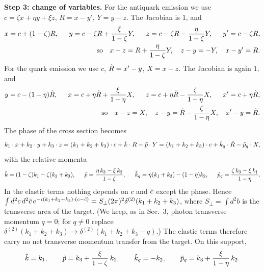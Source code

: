\documentclass[9pt]{article}
\numberwithin{equation}{section}
\begin{document}
\noindent\textbf{Step 3: change of variables.} For the antiquark emission we use $c=\zeta x+\eta y+\xi z$, $R=x-y'$, $Y=y-z$. The Jacobian is $1$, and
\begin{align}
x = c+(1-\zeta)R,\hspace{1.5em} y = c-\zeta R+\frac{\xi}{1-\zeta}Y,\hspace{1.5em} z = c-\zeta R-\frac{\eta}{1-\zeta}Y,\hspace{1.5em} y' = c-\zeta R,\notag \\ \text{so}\hspace{1em} x-z = R+\frac{\eta}{1-\zeta}Y,\hspace{1em} z-y=-Y,\hspace{1em} x-y' = R .
\end{align}
For the quark emission we use $c$, $\Tilde{R}=x'-y$, $X=x-z$. The Jacobian is again $1$, and
\begin{align}
y = c-(1-\eta)\Tilde{R},\hspace{1.5em} x = c+\eta\Tilde{R}+\frac{\xi}{1-\eta}X,\hspace{1.5em} z = c+\eta\Tilde{R}-\frac{\zeta}{1-\eta}X,\hspace{1.5em} x' = c+\eta\Tilde{R},\notag \\ \text{so}\hspace{1em} x-z = X,\hspace{1em} z-y = \Tilde{R}-\frac{\zeta}{1-\eta}X,\hspace{1em} x'-y=\Tilde{R} .
\end{align}
The phase of the cross section becomes
\begin{align}\label{eq:phase}
k_{1}\cdot x+k_{2}\cdot y+k_{3}\cdot z = (k_{1}+k_{2}+k_{3})\cdot c+\Tilde{k}\cdot R-\Tilde{p}\cdot Y = (k_{1}+k_{2}+k_{3})\cdot c+\Tilde{k}_{q}\cdot\Tilde{R}-\Tilde{p}_{q}\cdot X,
\end{align}
with the relative momenta
\begin{align}\label{eq:relmom}
\Tilde{k} = (1-\zeta)k_{1}-\zeta(k_{2}+k_{3}),\hspace{1.5em} \Tilde{p}=\frac{\eta\,k_{3}-\xi\,k_{2}}{1-\zeta},\hspace{1.5em} \Tilde{k}_{q} = \eta(k_{1}+k_{3})-(1-\eta)k_{2},\hspace{1.5em} \Tilde{p}_{q} = \frac{\zeta\,k_{3}-\xi\,k_{1}}{1-\eta}.
\end{align}
In the elastic terms nothing depends on $c$ and $\Bar{c}$ except the phase. Hence $\int d^{2}c\,d^{2}\Bar{c}\,e^{-i(k_{1}+k_{2}+k_{3})\cdot(c-\Bar{c})} = S_{\perp}(2\pi)^{2}\delta^{(2)}(k_{1}+k_{2}+k_{3})$, where $S_{\perp}=\int d^{2}b$ is the transverse area of the target. (We keep, as in Sec.~3, photon transverse momentum $q=0$; for $q\neq0$ replace $\delta^{(2)}(k_{1}+k_{2}+k_{3})\rightarrow\delta^{(2)}(k_{1}+k_{2}+k_{3}-q)$.) The elastic terms therefore carry no net transverse momentum transfer from the target. On this support,
$$\Tilde{k}=k_{1},\hspace{2em}\Tilde{p}=k_{3}+\frac{\xi}{1-\zeta}\,k_{1},\hspace{2em}\Tilde{k}_{q}=-k_{2},\hspace{2em}\Tilde{p}_{q}=k_{3}+\frac{\xi}{1-\eta}\,k_{2}.$$
\end{document}
